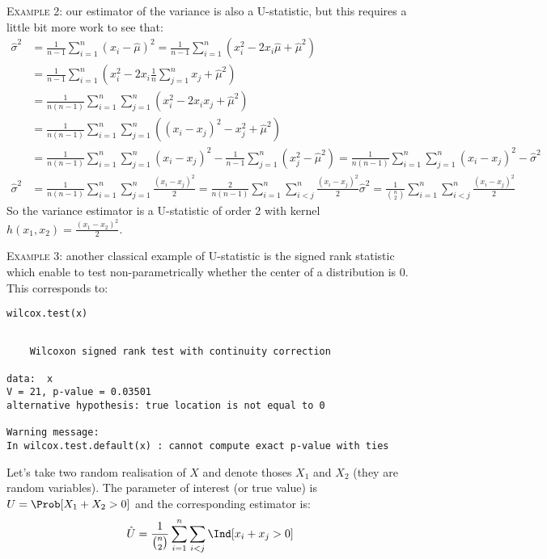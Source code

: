 \documentclass[12pt]{article}
\begin{document}
\textsc{Example 2}: our estimator of the variance is also a
U-statistic, but this requires a little bit more work to see that:
\begin{align*}
\hat{\sigma}^2 &= \frac{1}{n-1} \sum_{i=1}^n (x_i-\hat{\mu})^2 = \frac{1}{n-1} \sum_{i=1}^n \left(x_i^2 - 2 x_i \hat{\mu} + \hat{\mu}^2\right) \\
&=  \frac{1}{n-1} \sum_{i=1}^n \left(x_i^2 - 2 x_i \frac{1}{n} \sum_{j=1}^n x_j + \hat{\mu}^2\right) \\
&=  \frac{1}{n(n-1)} \sum_{i=1}^n \sum_{j=1}^n \left( x_i^2 - 2 x_i  x_j + \hat{\mu}^2 \right) \\
&=  \frac{1}{n(n-1)} \sum_{i=1}^n \sum_{j=1}^n \left( (x_i - x_j)^2 - x_j^2 + \hat{\mu}^2 \right) \\
&=  \frac{1}{n(n-1)} \sum_{i=1}^n \sum_{j=1}^n (x_i - x_j)^2 - \frac{1}{n-1} \sum_{j=1}^n \left(x_j^2 - \hat{\mu}^2\right)
=  \frac{1}{n(n-1)} \sum_{i=1}^n \sum_{j=1}^n (x_i - x_j)^2 - \hat{\sigma}^2 \\
\hat{\sigma}^2 &=  \frac{1}{n(n-1)} \sum_{i=1}^n \sum_{j=1}^n \frac{(x_i - x_j)^2}{2} 
=  \frac{2}{n(n-1)} \sum_{i=1}^n \sum_{i<j}^n \frac{(x_i - x_j)^2}{2}
\hat{\sigma}^2 =  \frac{1}{{n \choose 2}} \sum_{i=1}^n \sum_{i<j}^n \frac{(x_i - x_j)^2}{2} 
\end{align*}
So the variance estimator is a U-statistic of order 2 with kernel
\(h(x_1,x_2)=\frac{(x_1 - x_2)^2}{2}\).

\bigskip

\textsc{Example 3}: another classical example of U-statistic is the
signed rank statistic which enable to test non-parametrically whether
the center of a distribution is 0. This corresponds to:
\lstset{language=r,label= ,caption= ,captionpos=b,numbers=none}
\begin{lstlisting}
wilcox.test(x)
\end{lstlisting}

\begin{verbatim}

	Wilcoxon signed rank test with continuity correction

data:  x
V = 21, p-value = 0.03501
alternative hypothesis: true location is not equal to 0

Warning message:
In wilcox.test.default(x) : cannot compute exact p-value with ties
\end{verbatim}

Let's take two random realisation of \(X\) and denote thoses \(X_1\)
and \(X_2\) (they are random variables). The parameter of interest (or
true value) is \(U = \Prob[X_1+X_2>0]\) and the corresponding
estimator is:
\begin{align*}
\hat{U} = \frac{1}{{n \choose 2}} \sum_{i=1}^{n} \sum_{i<j} \Ind[x_i+x_j>0]
\end{align*}
\end{document}
